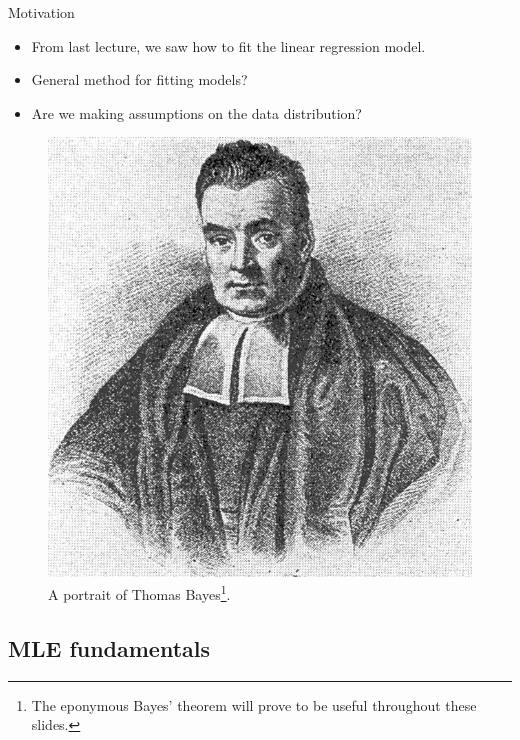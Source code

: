 \documentclass{beamer}
\numberwithin{equation}{section}
\begin{document}
\begin{frame}{Motivation}
    \begin{itemize}
        \item
        From last lecture, we saw how to fit the linear regression model.

        \item
        General method for fitting models?

        \item
        Are we making assumptions on the data distribution?
    \end{itemize}
    \begin{figure}[h!]
        \centering
        \includegraphics[scale = 0.18]{thomas_bayes.jpg}
        \caption{
            A portrait of Thomas Bayes\footnote{
                The eponymous Bayes' theorem will prove to be useful
                throughout these slides.
            }.
        }
        \label{thomas_bayes}
    \end{figure}
\end{frame}

\subsection{MLE fundamentals}
\end{document}
